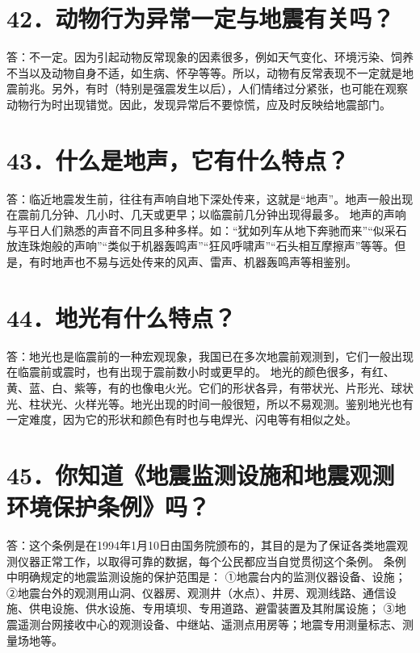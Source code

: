 \documentclass[a4paper,10pt,english]{sphinxmanual}
\begin{document}
\section{42．动物行为异常一定与地震有关吗？}
\label{\detokenize{index:id48}}
答：不一定。因为引起动物反常现象的因素很多，例如天气变化、环境污染、饲养不当以及动物自身不适，如生病、怀孕等等。所以，动物有反常表现不一定就是地震前兆。另外，有时（特别是强震发生以后），人们情绪过分紧张，也可能在观察动物行为时出现错觉。因此，发现异常后不要惊慌，应及时反映给地震部门。


\section{43．什么是地声，它有什么特点？}
\label{\detokenize{index:id49}}
答：临近地震发生前，往往有声响自地下深处传来，这就是“地声”。地声一般出现在震前几分钟、几小时、几天或更早；以临震前几分钟出现得最多。
地声的声响与平日人们熟悉的声音不同且多种多样。如：“犹如列车从地下奔驰而来”“似采石放连珠炮般的声响”“类似于机器轰鸣声”“狂风呼啸声”“石头相互摩擦声”等等。但是，有时地声也不易与远处传来的风声、雷声、机器轰鸣声等相鉴别。


\section{44．地光有什么特点？}
\label{\detokenize{index:id50}}
答：地光也是临震前的一种宏观现象，我国已在多次地震前观测到，它们一般出现在临震前或震时，也有出现于震前数小时或更早的。
地光的颜色很多，有红、黄、蓝、白、紫等，有的也像电火光。它们的形状各异，有带状光、片形光、球状光、柱状光、火样光等。地光出现的时间一般很短，所以不易观测。鉴别地光也有一定难度，因为它的形状和颜色有时也与电焊光、闪电等有相似之处。


\section{45．你知道《地震监测设施和地震观测环境保护条例》吗？}
\label{\detokenize{index:id51}}
答：这个条例是在1994年1月10日由国务院颁布的，其目的是为了保证各类地震观测仪器正常工作，以取得可靠的数据，每个公民都应当自觉贯彻这个条例。
条例中明确规定的地震监测设施的保护范围是：
①地震台内的监测仪器设备、设施；
②地震台外的观测用山洞、仪器房、观测井（水点）、井房、观测线路、通信设施、供电设施、供水设施、专用填坝、专用道路、避雷装置及其附属设施；
③地震遥测台网接收中心的观测设备、中继站、遥测点用房等；地震专用测量标志、测量场地等。
\end{document}
